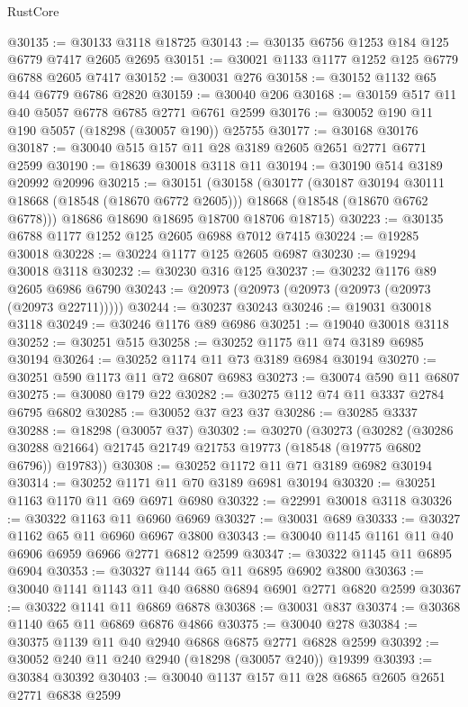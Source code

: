 \begin{lexlean}{RustCore}
\begin{coremodule}
@30135 := @30133 @3118 @18725
@30143 := @30135 @6756 @1253 @184 @125 @6779 @7417 @2605 @2695
@30151 := @30021 @1133 @1177 @1252 @125 @6779 @6788 @2605 @7417
@30152 := @30031 @276
@30158 := @30152 @1132 @65 @44 @6779 @6786 @2820
@30159 := @30040 @206
@30168 := @30159 @517 @11 @40 @5057 @6778 @6785 @2771 @6761 @2599
@30176 := @30052 @190 @11 @190 @5057 (@18298 (@30057 @190)) @25755
@30177 := @30168 @30176
@30187 := @30040 @515 @157 @11 @28 @3189 @2605 @2651 @2771 @6771 @2599
@30190 := @18639 @30018 @3118 @11
@30194 := @30190 @514 @3189 @20992 @20996
@30215 := @30151
    (@30158
      (@30177
        (@30187 @30194 @30111 @18668 (@18548 (@18670 @6772 @2605)))
        @18668
        (@18548 (@18670 @6762 @6778)))
      @18686
      @18690
      @18695
      @18700
      @18706
      @18715)
@30223 := @30135 @6788 @1177 @1252 @125 @2605 @6988 @7012 @7415
@30224 := @19285 @30018
@30228 := @30224 @1177 @125 @2605 @6987
@30230 := @19294 @30018 @3118
@30232 := @30230 @316 @125
@30237 := @30232 @1176 @89 @2605 @6986 @6790
@30243 := @20973 (@20973 (@20973 (@20973 (@20973 (@20973 @22711)))))
@30244 := @30237 @30243
@30246 := @19031 @30018 @3118
@30249 := @30246 @1176 @89 @6986
@30251 := @19040 @30018 @3118
@30252 := @30251 @515
@30258 := @30252 @1175 @11 @74 @3189 @6985 @30194
@30264 := @30252 @1174 @11 @73 @3189 @6984 @30194
@30270 := @30251 @590 @1173 @11 @72 @6807 @6983
@30273 := @30074 @590 @11 @6807
@30275 := @30080 @179 @22
@30282 := @30275 @112 @74 @11 @3337 @2784 @6795 @6802
@30285 := @30052 @37 @23 @37
@30286 := @30285 @3337
@30288 := @18298 (@30057 @37)
@30302 := @30270
    (@30273
      (@30282
        (@30286 @30288 @21664)
        @21745
        @21749
        @21753
        @19773
        (@18548 (@19775 @6802 @6796))
        @19783))
@30308 := @30252 @1172 @11 @71 @3189 @6982 @30194
@30314 := @30252 @1171 @11 @70 @3189 @6981 @30194
@30320 := @30251 @1163 @1170 @11 @69 @6971 @6980
@30322 := @22991 @30018 @3118
@30326 := @30322 @1163 @11 @6960 @6969
@30327 := @30031 @689
@30333 := @30327 @1162 @65 @11 @6960 @6967 @3800
@30343 := @30040 @1145 @1161 @11 @40 @6906 @6959 @6966 @2771 @6812 @2599
@30347 := @30322 @1145 @11 @6895 @6904
@30353 := @30327 @1144 @65 @11 @6895 @6902 @3800
@30363 := @30040 @1141 @1143 @11 @40 @6880 @6894 @6901 @2771 @6820 @2599
@30367 := @30322 @1141 @11 @6869 @6878
@30368 := @30031 @837
@30374 := @30368 @1140 @65 @11 @6869 @6876 @4866
@30375 := @30040 @278
@30384 := @30375 @1139 @11 @40 @2940 @6868 @6875 @2771 @6828 @2599
@30392 := @30052 @240 @11 @240 @2940 (@18298 (@30057 @240)) @19399
@30393 := @30384 @30392
@30403 := @30040 @1137 @157 @11 @28 @6865 @2605 @2651 @2771 @6838 @2599

\end{coremodule}
\end{lexlean}
